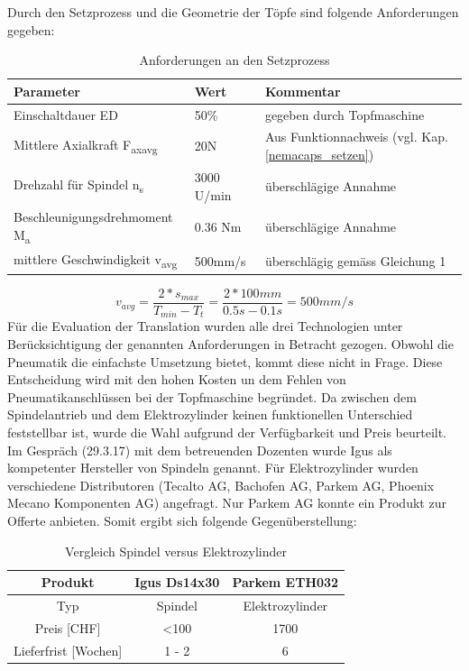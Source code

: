 Durch den Setzprozess und die Geometrie der Töpfe sind folgende Anforderungen gegeben:
\begin{table}[H]
\begin{tabular}{|l|l|l|}
	\hline 
	Parameter & Wert & Kommentar \\ 
	\hline 
	Einschaltdauer ED & 50\% & gegeben durch Topfmaschine \\ 
	\hline 
	Mittlere Axialkraft F\textsubscript{axavg} & 20N & Aus Funktionnachweis (vgl. Kap. \ref{nemacaps_setzen}) \\ 
	\hline 
	Drehzahl für Spindel n\textsubscript{s}& 3000 U/min & überschlägige Annahme \\ 
	\hline 
	Beschleunigungsdrehmoment M\textsubscript{a}& 0.36 Nm & überschlägige Annahme \\ 
	\hline 
	mittlere Geschwindigkeit v\textsubscript{avg}& 500mm/s & überschlägig gemäss Gleichung 1\\ 
	\hline 
\end{tabular} 
\caption{Anforderungen an den Setzprozess}
\label{tab:annahmen_setzeinheit}
\end{table}
\begin{equation}
v_{avg}=\frac{2*s_{max}}{T_{min}-T_{t}}=\frac{2*100mm}{0.5s-0.1s}=500mm/s
\end{equation}
\newline
Für die Evaluation der Translation wurden alle drei Technologien unter Berücksichtigung der genannten Anforderungen in Betracht gezogen. Obwohl die Pneumatik die einfachste Umsetzung bietet, kommt diese nicht in Frage. Diese Entscheidung wird mit den hohen Kosten un dem Fehlen von Pneumatikanschlüssen bei der Topfmaschine begründet.
\newline
Da zwischen dem Spindelantrieb und dem Elektrozylinder keinen funktionellen Unterschied feststellbar ist, wurde die Wahl aufgrund der Verfügbarkeit und Preis beurteilt. Im Gespräch (29.3.17) mit dem betreuenden Dozenten wurde Igus als kompetenter Hersteller von Spindeln genannt. Für Elektrozylinder wurden verschiedene Distributoren (Tecalto AG, Bachofen AG, Parkem AG, Phoenix Mecano Komponenten AG) angefragt. Nur Parkem AG konnte ein Produkt zur Offerte anbieten. Somit ergibt sich folgende Gegenüberstellung:
\begin{table}[H]
\begin{tabular}{|c|c|c|}
	\hline 
	Produkt & Igus Ds14x30 & Parkem ETH032  \\ 
	\hline 
	Typ & Spindel & Elektrozylinder \\ 
	\hline 
	Preis [CHF] & <100  & 1700    \\ 
	\hline 
	Lieferfrist [Wochen] &1 - 2  &6 \\ 
	\hline 
\end{tabular}
	\vspace{0.2cm}
	\caption{Vergleich Spindel versus Elektrozylinder}
	\label{tab:spindelauslegung}
\end{table}

